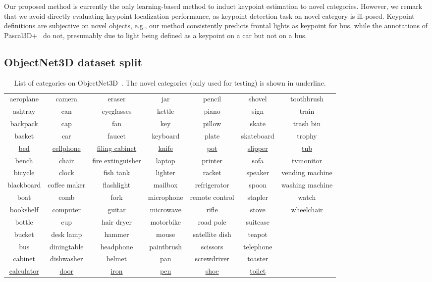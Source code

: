 \documentclass[runningheads]{llncs}
\begin{document}
Our proposed method is currently the only learning-based method to induct keypoint estimation to novel categories. However, we remark that we avoid directly evaluating keypoint localization performance, as keypoint detection task on novel category is ill-posed. Keypoint definitions are subjective on novel objects, e.g., our method consistently predicts frontal lights as keypoint for bus, while the annotations of Pascal3D+~\cite{xiang2014beyond} do not, presumably due to light being defined as a keypoint on a car but not on a bus.




\subsection{ObjectNet3D dataset split}

\begin{table*} [t]
 \begin{center} 
 \tiny
 \begin{tabular}{c|c|c|c|c|c|c} 
 \hline
aeroplane & camera & eraser & jar & pencil & shovel & toothbrush   \\
ashtray & can & eyeglasses & kettle & piano & sign & train   \\
backpack & cap & fan & key & pillow & skate & trash bin   \\
basket & car & faucet & keyboard & plate & skateboard & trophy   \\
\underline{bed} & \underline{cellphone} & \underline{filing cabinet} & \underline{knife} & \underline{pot} & \underline{slipper} & \underline{tub}   \\
bench & chair & fire extinguisher & laptop & printer & sofa & tvmonitor   \\
bicycle & clock & fish tank & lighter & racket & speaker & vending machine   \\
blackboard & coffee maker & flashlight & mailbox & refrigerator & spoon & washing machine   \\
boat & comb & fork & microphone & remote control & stapler & watch   \\
\underline{bookshelf} & \underline{computer} & \underline{guitar} & \underline{microwave} & \underline{rifle} & \underline{stove} & \underline{wheelchair}   \\
bottle & cup & hair dryer & motorbike & road pole & suitcase &    \\
bucket & desk lamp & hammer & mouse & satellite dish & teapot &    \\
bus & diningtable & headphone & paintbrush & scissors & telephone &    \\
cabinet & dishwasher & helmet & pan & screwdriver & toaster &    \\
\underline{calculator} & \underline{door} & \underline{iron} & \underline{pen} & \underline{shoe} & \underline{toilet} &    \\
\hline
\end{tabular} 
{\caption{List of categories on ObjectNet3D~\cite{xiang2016objectnet3d}. The novel categories (only used for testing) is shown in underline.}
\label{table:cat}}
\end{center} 

\end{table*}
\end{document}
